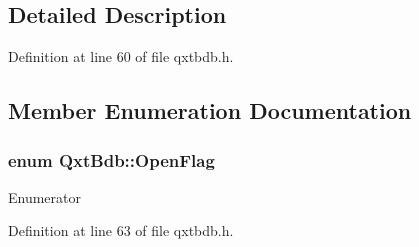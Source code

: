 \subsection{Detailed Description}


Definition at line 60 of file qxtbdb.\-h.



\subsection{Member Enumeration Documentation}
\hypertarget{class_qxt_bdb_a5ad90b31cad64fcaa2664bf456c694e0}{
\subsubsection[{Open\-Flag}]{\setlength{\rightskip}{0pt plus 5cm}enum {\bf Qxt\-Bdb\-::\-Open\-Flag}}}\label{class_qxt_bdb_a5ad90b31cad64fcaa2664bf456c694e0}
\begin{Desc}
\item[Enumerator]\par
\begin{description}
\item[{\em 
\hypertarget{class_qxt_bdb_a5ad90b31cad64fcaa2664bf456c694e0a5cdcd2672abc85b9b69c8e29de69d6b3}{Create\-Database}\label{class_qxt_bdb_a5ad90b31cad64fcaa2664bf456c694e0a5cdcd2672abc85b9b69c8e29de69d6b3}
}]\item[{\em 
\hypertarget{class_qxt_bdb_a5ad90b31cad64fcaa2664bf456c694e0a08e4dc60c860b3a5b1f769fd40d8375c}{Read\-Only}\label{class_qxt_bdb_a5ad90b31cad64fcaa2664bf456c694e0a08e4dc60c860b3a5b1f769fd40d8375c}
}]\item[{\em 
\hypertarget{class_qxt_bdb_a5ad90b31cad64fcaa2664bf456c694e0a9a9502d4dec9d2d0429ef0daf1a51a66}{Lock\-Free}\label{class_qxt_bdb_a5ad90b31cad64fcaa2664bf456c694e0a9a9502d4dec9d2d0429ef0daf1a51a66}
}]\end{description}
\end{Desc}


Definition at line 63 of file qxtbdb.\-h.



